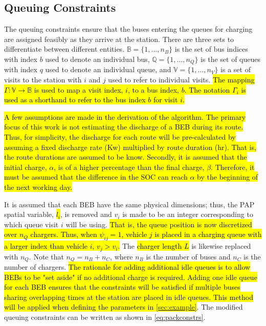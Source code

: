 \documentclass[utf8]{FrontiersinHarvard}
\begin{document}
\subsection{Queuing Constraints}
\label{sec:queuing}
\noindent The queuing constraints ensure that the buses entering the queues for charging are assigned feasibly as they
arrive at the station. There are three sets to differentiate between different entities. \(\mathbb{B} = \{1, ..., n_B\}\)
is the set of bus indices with index \(b\) used to denote an individual bus, \(\mathbb{Q} = \{1, ..., n_Q\}\) is the set of queues
with index \(q\) used to denote an individual queue, and \(\mathbb{V} = \{1, ..., n_V\}\) is a set of visits to the station
with \(i\) and \(j\) used to refer to individual visits. \hl{The mapping $\Gamma: \mathbb{V} \rightarrow \mathbb{B}$ is used to map a visit index, $i$, to a bus index, $b$. The notation $\Gamma_i$ is used as a shorthand to refer to the bus index $b$ for visit $i$.}

\hl{A few assumptions are made in the derivation of the algorithm. The primary focus of this work is not estimating the
  discharge of a BEB during its route. Thus, for simplicity, the discharge for each route will be pre-calculated by
  assuming a fixed discharge rate (Kw) multiplied by route duration (hr). That is, the route durations are assumed to be
  know. Secondly, it is assumed that the initial charge, $\alpha$, is of a higher percentage than the final charge,
  $\beta$. Therefore, it must be assumed that the difference in the SOC can reach $\alpha$ by the beginning of the next
  working day.}

It is assumed that each BEB have the same physical dimensions; thus, the PAP spatial variable, \hl{$l_i$}, is removed
and \(v_i\) is made to be an integer corresponding to which queue visit \(i\) will be using. \hl{That is, the queue position is now discretized over $n_Q$ chargers. Thus, when $\psi_{ij} = 1$, vehicle $j$ is placed in a charging queue with a larger index than vehicle $i$, $v_j > v_i$.} The \hl{charger length $L$} is likewise replaced with \(n_Q\).
Note that \(n_Q = n_B + n_C\), where \(n_B\) is the number of buses and \(n_C\) is the number of chargers. \hl{The rationale for adding additional idle queues is to allow BEBs to be "set aside" if no additional charge is required. Adding one idle queue for each BEB ensures that the constraints will be satisfied if multiple buses sharing overlapping times at the station are placed in idle queues. This method will be applied when defining the parameters in {\autoref{sec:example}}}. The modified queuing constraints can be written as shown in \autoref{eq:packconstrs}.
\end{document}
